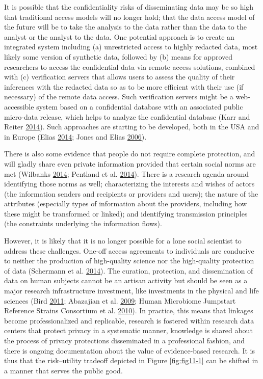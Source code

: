 \documentclass[]{krantz}
\begin{document}
It is possible that the confidentiality risks of disseminating data may
be so high that traditional access models will no longer hold; that the
data access model of the future will be to take the analysis to the data
rather than the data to the analyst or the analyst to the data. One
potential approach is to create an integrated system including (a)
unrestricted access to highly redacted data, most likely some version of
synthetic data, followed by (b) means for approved researchers to access
the confidential data via remote access solutions, combined with (c)
verification servers that allows users to assess the quality of their
inferences with the redacted data so as to be more efficient with their
use (if necessary) of the remote data access. Such verification servers
might be a web-accessible system based on a confidential database with
an associated public micro-data release, which helps to analyze the
confidential database (Karr and Reiter
\protect\hyperlink{ref-karr2014analytical}{2014}). Such approaches are
starting to be developed, both in the USA and in Europe (Elias
\protect\hyperlink{ref-Elias2014}{2014}; Jones and Elias
\protect\hyperlink{ref-jones2006administrative}{2006}).

There is also some evidence that people do not require complete
protection, and will gladly share even private information provided that
certain social norms are met (Wilbanks
\protect\hyperlink{ref-Wilbanks2014}{2014}; Pentland et al.
\protect\hyperlink{ref-Pentland2014}{2014}). There is a research agenda
around identifying those norms as well; characterizing the interests and
wishes of actors (the information senders and recipients or providers
and users); the nature of the attributes (especially types of
information about the providers, including how these might be
transformed or linked); and identifying transmission principles (the
constraints underlying the information flows).

However, it is likely that it is no longer possible for a lone social
scientist to address these challenges. One-off access agreements to
individuals are conducive to neither the production of high-quality
science nor the high-quality protection of data (Schermann et al.
\protect\hyperlink{ref-schermann2014big}{2014}). The curation,
protection, and dissemination of data on human subjects cannot be an
artisan activity but should be seen as a major research infrastructure
investment, like investments in the physical and life sciences (Bird
\protect\hyperlink{ref-bird2011computing}{2011}; Abazajian et al.
\protect\hyperlink{ref-abazajian2009seventh}{2009}; Human Microbiome
Jumpstart Reference Strains Consortium et al.
\protect\hyperlink{ref-human2010catalog}{2010}). In practice, this means
that linkages become professionalized and replicable, research is
fostered within research data centers that protect privacy in a
systematic manner, knowledge is shared about the process of privacy
protections disseminated in a professional fashion, and there is ongoing
documentation about the value of evidence-based research. It is thus
that the risk--utility tradeoff depicted in Figure \ref{fig:fig11-1} can
be shifted in a manner that serves the public good.
\end{document}
